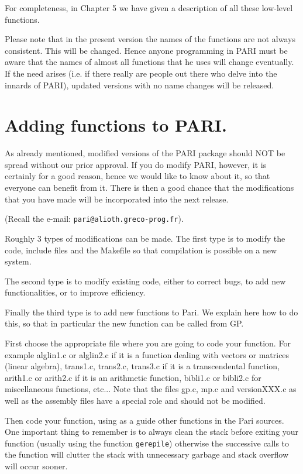 For completeness, in Chapter 5 we have given a description of all these
low-level functions.

Please note that in the present version \vers{} the names of the functions are 
not always consistent. This will be changed. Hence anyone programming
in PARI must be aware that the names of almost all functions that he uses will
change eventually. If the need arises (i.e. if there really are people out 
there who delve into the innards of PARI), updated versions with no name 
changes will be released.

\section{Adding functions to PARI.}

As already mentioned, modified versions of the PARI package should NOT be 
spread without our prior approval. If you do modify PARI, however, it is
certainly for a good reason, hence we would like to know about it, so that
everyone can benefit from it. There is then a good chance that the 
modifications that you have made will be incorporated into the next release.

(Recall the e-mail: {\tt pari@alioth.greco-prog.fr}).

Roughly 3 types of modifications can be made. The first type is to modify the
code, include files and the Makefile so that compilation is possible on a new
system.

The second type is to modify existing code, either to correct bugs, to
add new functionalities, or to improve efficiency.

Finally the third type is to add new functions to Pari. We explain here how
to do this, so that in particular the new function can be called from GP.

First choose the appropriate file where you are going to code your function.
For example alglin1.c or alglin2.c if it is a function dealing with vectors
or matrices (linear algebra), trans1.c, trans2.c, trans3.c if it is a
transcendental function, arith1.c or arith2.c if it is an arithmetic function,
bibli1.c or bibli2.c for miscellaneous functions, etc... Note that the files
gp.c, mp.c and versionXXX.c as well as the assembly files have a special role
and should not be modified. 

Then code your function, using as a guide other functions in the Pari sources.
One important thing to remember is to always clean the stack before exiting
your function (usually using the function {\tt gerepile}) otherwise the 
successive calls to the function will clutter the stack with unnecessary
garbage and stack overflow will occur sooner.

